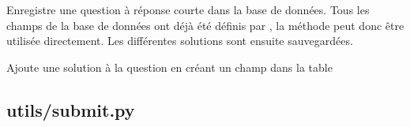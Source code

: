 \documentclass[a4,10pt,french]{sphinxmanual}
\begin{document}
\begin{fulllineitems}
\label{source:quiz.utils.save.SaveSimpleQuestion}
Enregistre une question à réponse courte dans la base de données. Tous les champs
de la base de données ont déjà été définis par {\hyperref[source:quiz.utils.save.SaveQuestion]{\emph{}}},
la méthode  peut donc être utilisée directement. Les différentes
solutions sont ensuite sauvegardées.

\begin{fulllineitems}
\label{source:quiz.utils.save.SaveSimpleQuestion.add_answer}
Ajoute une solution à la question en créant un champ dans la table 

\end{fulllineitems}


\end{fulllineitems}



\subsection{utils/submit.py}
\label{source:utils-submit-py}\label{source:module-quiz.utils.submit}
\end{document}

